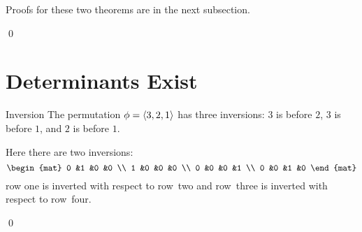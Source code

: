 \documentclass[10pt,t]{beamer}
\begin{document}
\begin{frame}
Proofs for these two theorems are in the next subsection.

\th[th:DetsExist]

\th[th:DeterminantOfAMatrixEqualsDeterminantOfTranspose]

\pause
\medskip
{}
\pause
\pf
{}
\qed
\end{frame}




\section{Determinants Exist}
\begin{frame}{Inversion}
\df[df:Inversion]
\pause
\ex The permutation $\phi=\langle3,2,1\rangle$ has three inversions:
$3$ is before $2$, $3$ is before $1$, and 
$2$ is before $1$.
\end{frame}
\begin{frame}
\ex
Here there are two inversions:
\begin{equation*}
  \begin{mat}
    0 &1 &0 &0 \\
    1 &0 &0 &0 \\
    0 &0 &0 &1 \\
    0 &0 &1 &0
  \end{mat}
\end{equation*}
row one is inverted with respect to row~two and row~three is inverted with 
respect to row~four.
\end{frame}




\begin{frame}
\lm[le:SwapsChangeSgn]

\pause
\pf
{}
\end{frame}
\begin{frame}
\end{frame}
\begin{frame}
\noindent{}
\qed
\end{frame}
\end{document}
